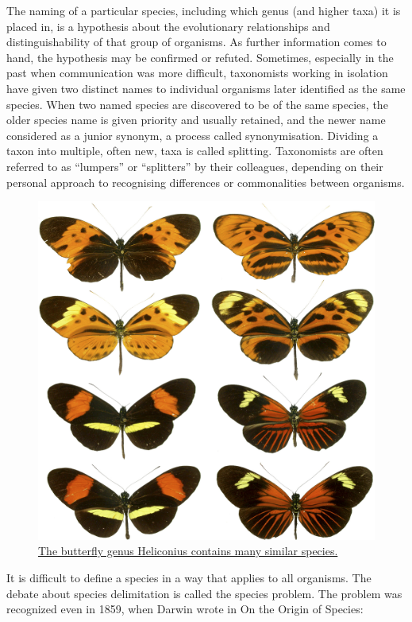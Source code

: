 The naming of a particular species, including which genus (and higher taxa) it is placed in, is a hypothesis about the evolutionary relationships and distinguishability of that group of organisms. As further information comes to hand, the hypothesis may be confirmed or refuted. Sometimes, especially in the past when communication was more difficult, taxonomists working in isolation have given two distinct names to individual organisms later identified as the same species. When two named species are discovered to be of the same species, the older species name is given priority and usually retained, and the newer name considered as a junior synonym, a process called synonymisation. Dividing a taxon into multiple, often new, taxa is called splitting. Taxonomists are often referred to as ``lumpers'' or ``splitters'' by their colleagues, depending on their personal approach to recognising differences or commonalities between organisms.



\begin{figure}

{\centering \includegraphics[width=0.7\linewidth]{./figures/systematics/Heliconius_mimicry} 

}

\caption{\href{https://commons.wikimedia.org/wiki/File:Heliconius_mimicry.png}{The butterfly genus Heliconius contains many similar species.}}\label{fig:species}
\end{figure}

It is difficult to define a species in a way that applies to all organisms. The debate about species delimitation is called the species problem. The problem was recognized even in 1859, when Darwin wrote in On the Origin of Species:

